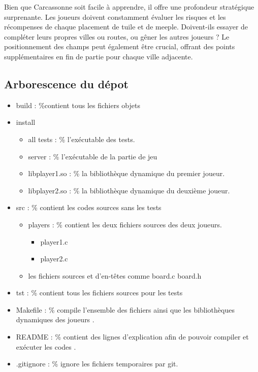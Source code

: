 Bien que Carcassonne soit facile à apprendre, il offre une profondeur stratégique surprenante. Les joueurs doivent constamment évaluer les risques et les récompenses de chaque placement de tuile et de meeple. Doivent-ils essayer de compléter leurs propres villes ou routes, ou gêner les autres joueurs ? Le positionnement des champs peut également être crucial, offrant des points supplémentaires en fin de partie pour chaque ville adjacente.
\subsection{Arborescence du dépot}
\begin{itemize}
    \item build :    \%contient tous les fichiers objets
    \item install
    \begin{itemize}
        \item all tests : \% l'exécutable des tests.
        \item server    : \% l'exécutable de la partie de jeu
        \item libplayer1.so : \% la bibliothèque dynamique du premier joueur.
        \item libplayer2.so : \% la bibliothèque dynamique du deuxième joueur.      
    \end{itemize}
    \item src : \% contient les codes sources sans les tests
    \begin{itemize}
        \item players : \% contient les deux fichiers sources des deux joueurs.
        \begin{itemize}
            \item player1.c 
            \item player2.c
        \end{itemize}
        \item les fichiers sources et d'en-têtes comme board.c board.h
    \end{itemize}
    \item tst : \% contient tous les fichiers sources pour les tests
    \item Makefile : \% compile l'ensemble des fichiers ainsi que les bibliothèques dynamiques des joueurs .
    \item README : \% contient des lignes d'explication afin de pouvoir compiler et exécuter les codes .
    \item .gitignore :  \% ignore les fichiers temporaires par git.
\end{itemize}

